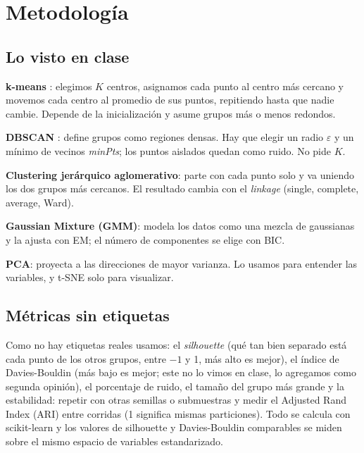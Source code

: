 \documentclass[10pt,a4paper]{article}
\begin{document}
\section{Metodología}

\subsection{Lo visto en clase}
\textbf{k-means} \cite{lloyd1982}: elegimos $K$ centros, asignamos cada punto al centro
más cercano y movemos cada centro al promedio de sus puntos, repitiendo hasta que nadie
cambie. Depende de la inicialización y asume grupos más o menos redondos.

\textbf{DBSCAN} \cite{ester1996}: define grupos como regiones densas. Hay que elegir un
radio $\varepsilon$ y un mínimo de vecinos \textit{minPts}; los puntos aislados quedan como
ruido. No pide $K$.

\textbf{Clustering jerárquico aglomerativo}: parte con cada punto solo y va uniendo los
dos grupos más cercanos. El resultado cambia con el \textit{linkage} (single, complete,
average, Ward).

\textbf{Gaussian Mixture (GMM)}: modela los datos como una mezcla de gaussianas y la
ajusta con EM; el número de componentes se elige con BIC.

\textbf{PCA}: proyecta a las direcciones de mayor varianza. Lo usamos para entender las
variables, y t-SNE solo para visualizar.

\subsection{Métricas sin etiquetas}
Como no hay etiquetas reales usamos: el \textit{silhouette} \cite{rousseeuw1987} (qué tan bien
separado está cada punto de los otros grupos, entre $-1$ y 1, más alto es mejor), el índice de
Davies-Bouldin \cite{davies1979} (más bajo es mejor; este no lo vimos en clase, lo agregamos
como segunda opinión), el porcentaje de ruido, el tamaño del
grupo más grande y la estabilidad: repetir con otras semillas o submuestras y medir el
Adjusted Rand Index (ARI) \cite{hubert1985} entre corridas (1 significa mismas particiones).
Todo se calcula con scikit-learn \cite{pedregosa2011} y los valores de silhouette y
Davies-Bouldin comparables se miden sobre el mismo espacio de variables estandarizado.
\end{document}
